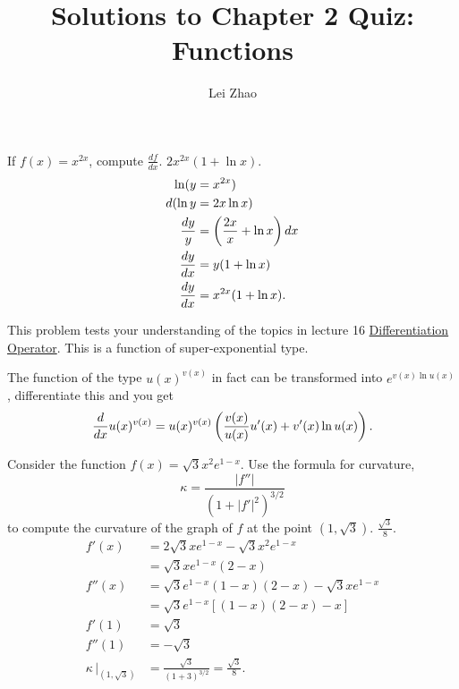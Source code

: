 

\everymath{\displaystyle}

\title{\bf Solutions to Chapter 2 Quiz: Functions}
\author{Lei Zhao}
\date{}


  \maketitle
  
    {If $f(x) = x^{2x}$, compute $\frac{df}{dx}$.}
    {$2x^{2x}(1 + \ln x)$.}
    \begin{align*}
      \ln( y &= x^{2x} ) \\
      d( \ln y &= 2x \ln x ) \\
      \frac{dy}{y} &= \left( \frac{2x}{x} + \ln x \right) dx \\
      \frac{dy}{dx} &= y (1 + \ln x) \\
      \frac{dy}{dx} &= x^{2x} (1 + \ln x).
    \end{align*}
    
    {\parasp This problem tests your understanding of the topics in lecture 16
    \href{https://class.coursera.org/calcsing-007/lecture/314}{Differentiation
    Operator}. This is a function of super-exponential type.
    
    The function of the type $u(x)^{v(x)}$ in fact can be transformed into
    $e^{v(x) \ln u(x)}$, differentiate this and you get
    \[ \frac{d}{dx} u(x)^{v(x)} = u(x)^{v(x)} \left( \frac{v(x)}{u(x)} u'(x) + 
    v'(x) \ln u(x) \right). \] }
    
    {Consider the function $f(x) = \sqrt{3}x^2e^{1-x}$. Use the formula
    for curvature,
    \[\kappa = \frac{\lvert f'' \rvert}{( 1+|f'|^2 )^{3/2}}\]
    to compute the curvature of the graph of $f$ at the point $(1,
    \sqrt{3})$.}
    {$\frac{\sqrt{3}}{8}$.}
    \begin{align*}
      f'(x) &= 2\sqrt{3}xe^{1-x} - \sqrt{3}x^2e^{1-x} \\
        &= \sqrt{3}xe^{1-x}(2-x) \\
      f''(x) &= \sqrt{3}e^{1-x}(1-x)(2-x) - \sqrt{3}xe^{1-x} \\
        &= \sqrt{3}e^{1-x}[(1-x)(2-x)-x] \\
      f'(1) &= \sqrt{3} \\
      f''(1) &= -\sqrt{3} \\
      \kappa \,\Bigr\vert_{(1, \sqrt{3})}
        &= \frac{\sqrt{3}}{(1+3)^{3/2}}
        = \frac{\sqrt{3}}{8}.
    \end{align*}
  
